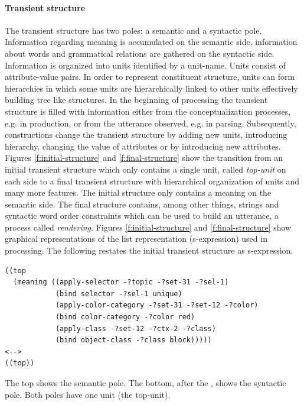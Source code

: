 \paragraph*{Transient structure}
The transient structure has two poles: a semantic and a syntactic pole.
Information regarding meaning is accumulated on the semantic
side, information about words and grammatical relations are
gathered on the syntactic side. Information is organized into 
units identified by a unit-name. Units consist of attribute-value pairs. 
In order to represent constituent structure, units can form hierarchies 
in which some units are hierarchically linked to other units effectively 
building tree like structures.
In the beginning of processing the transient structure is filled with 
information either from the conceptualization 
processes, e.g. in production, or from the utterance observed, e.g.
in parsing. Subsequently, constructions change the transient structure by adding new
units, introducing hierarchy, changing the value of attributes or by introducing 
new attributes. Figures \ref{f:initial-structure} and \ref{f:final-structure} show the transition from 
an initial transient structure which only contains a single unit, called \emph{top-unit} 
on each side to a final transient structure with hierarchical organization of units 
and many more features. The initial structure only contains a 
meaning on the semantic side. The final structure contains,
among other things, strings and syntactic word order constraints 
which can be used to build an utterance, a process called \emph{rendering}.
Figures \ref{f:initial-structure} and \ref{f:final-structure} show graphical representations
of the list representation (s-expression) used in processing. The
following restates the initial transient structure as s-expression.
\begin{footnotesize}
\begin{verbatim}
((top
  (meaning ((apply-selector -?topic -?set-31 -?sel-1)
            (bind selector -?sel-1 unique)
            (apply-color-category -?set-31 -?set-12 -?color)
            (bind color-category -?color red)
            (apply-class -?set-12 -?ctx-2 -?class)
            (bind object-class -?class block)))))
<-->
((top))
\end{verbatim}
\end{footnotesize}
The top shows the semantic pole. The bottom, after the {\footnotesize\tt <-->},
shows the syntactic pole. Both poles have one unit (the top-unit). 
